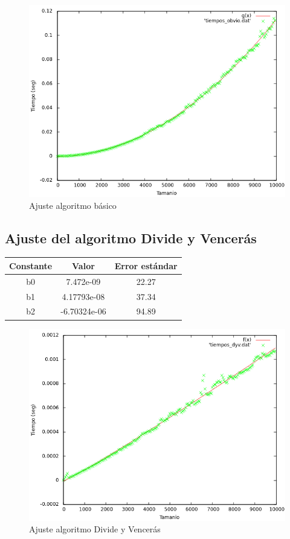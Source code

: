 \documentclass{article}
\begin{document}
	\begin{figure}[H]
		\centering
		\includegraphics[totalheight=8cm]{img/Basico_ajustada}
		\caption{Ajuste algoritmo básico}
		\label{fig:Basico_ajustada}
	\end{figure}
	
	\subsection{Ajuste del algoritmo Divide y Vencerás}
	
	\begin{longtable}{|c|c|c|}
		\hline
		Constante		& Valor			& Error estándar	\\ \hline
		b0              & 7.472e-09		& 22.27	 \\ \hline
		b1              & 4.17793e-08 	& 37.34	 \\ \hline
		b2              & -6.70324e-06	& 94.89	 \\ \hline
	\end{longtable}
	
	\begin{figure}[H]
		\centering
		\includegraphics[totalheight=8cm]{img/DyV_ajustada}
		\caption{Ajuste algoritmo Divide y Vencerás}
		\label{fig:DyV_ajustada}
	\end{figure}
	
\end{document}
